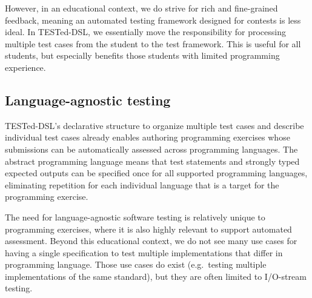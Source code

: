 \documentclass[../main]{subfiles}
\begin{document}
However, in an educational context, we do strive for rich and fine-grained feedback, meaning an automated testing framework designed for contests is less ideal.
In TESTed-DSL, we essentially move the responsibility for processing multiple test cases from the student to the test framework.
This is useful for all students, but especially benefits those students with limited programming experience.

\subsection{Language-agnostic testing}\label{subsec:language-agnostic-testing}

TESTed-DSL's declarative structure to organize multiple test cases and describe individual test cases already enables authoring programming exercises whose submissions can be automatically assessed across programming languages.
The abstract programming language means that test statements and strongly typed expected outputs can be specified once for all supported programming languages, eliminating repetition for each individual language that is a target for the programming exercise.

The need for language-agnostic software testing is relatively unique to programming exercises, where it is also highly relevant to support automated assessment.
Beyond this educational context, we do not see many use cases for having a single specification to test multiple implementations that differ in programming language.
Those use cases do exist (e.g.\ testing multiple implementations of the same standard), but they are often limited to I/O-stream testing.
\end{document}
